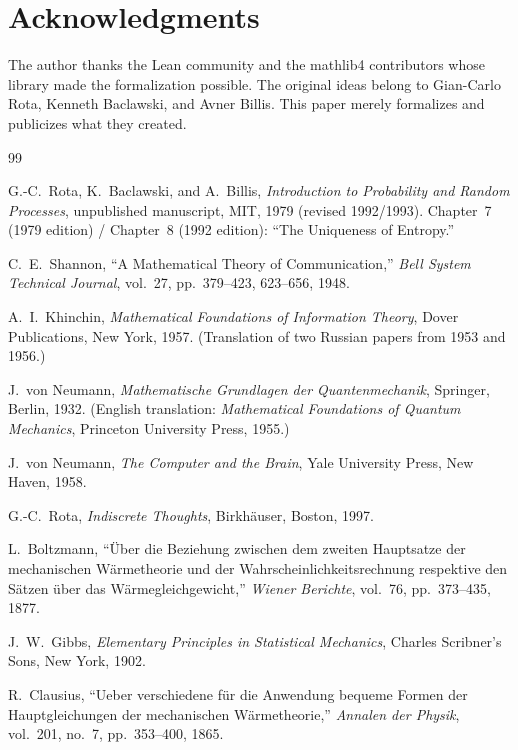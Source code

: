 \documentclass[12pt,a4paper]{article}
\theoremstyle{definition}
\begin{document}
\section*{Acknowledgments}

The author thanks the Lean community and the mathlib4 contributors
whose library made the formalization possible.  The original ideas
belong to Gian-Carlo Rota, Kenneth Baclawski, and Avner Billis.  This
paper merely formalizes and publicizes what they created.

\begin{thebibliography}{99}

G.-C.~Rota, K.~Baclawski, and A.~Billis,
\textit{Introduction to Probability and Random Processes},
unpublished manuscript, MIT, 1979 (revised 1992/1993).
Chapter~7 (1979 edition) / Chapter~8 (1992 edition):
``The Uniqueness of Entropy.''

C.~E.~Shannon,
``A Mathematical Theory of Communication,''
\textit{Bell System Technical Journal}, vol.~27, pp.~379--423, 623--656,
1948.

A.~I.~Khinchin,
\textit{Mathematical Foundations of Information Theory},
Dover Publications, New York, 1957.
(Translation of two Russian papers from 1953 and 1956.)

J.~von Neumann,
\textit{Mathematische Grundlagen der Quantenmechanik},
Springer, Berlin, 1932.
(English translation: \textit{Mathematical Foundations of Quantum
Mechanics}, Princeton University Press, 1955.)

J.~von Neumann,
\textit{The Computer and the Brain},
Yale University Press, New Haven, 1958.

G.-C.~Rota,
\textit{Indiscrete Thoughts},
Birkh\"auser, Boston, 1997.

L.~Boltzmann,
``\"Uber die Beziehung zwischen dem zweiten Hauptsatze der mechanischen
W\"armetheorie und der Wahrscheinlichkeitsrechnung respektive den
S\"atzen \"uber das W\"armegleichgewicht,''
\textit{Wiener Berichte}, vol.~76, pp.~373--435, 1877.

J.~W.~Gibbs,
\textit{Elementary Principles in Statistical Mechanics},
Charles Scribner's Sons, New York, 1902.

R.~Clausius,
``Ueber verschiedene f\"ur die Anwendung bequeme Formen der
Hauptgleichungen der mechanischen W\"armetheorie,''
\textit{Annalen der Physik}, vol.~201, no.~7, pp.~353--400, 1865.


\end{thebibliography}
\end{document}
